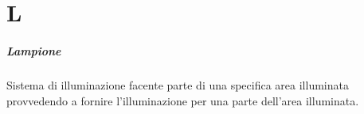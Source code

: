 \chapter{L}

\paragraph*{Lampione}
Sistema di illuminazione facente parte di una specifica area illuminata provvedendo a fornire l'illuminazione per una parte dell'area illuminata.